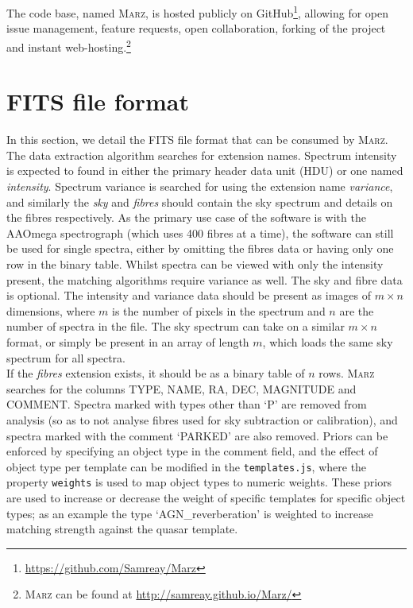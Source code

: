 \documentclass[iop]{emulateapj}
\newcommand{\marz}{\textsc{Marz}}
\begin{document}
The code base, named \marz{}, is hosted publicly on GitHub\footnote{\url{https://github.com/Samreay/Marz}}, allowing for open issue management, feature requests, open collaboration, forking of the project and instant web-hosting.\footnote{\marz{} can be found at \url{http://samreay.github.io/Marz/}}







\section{FITS file format}

In this section, we detail the FITS file format that can be consumed by \marz{}. The data extraction algorithm searches for extension names. Spectrum intensity is expected to found in either the primary header data unit (HDU) or one named \textit{intensity}. Spectrum variance is searched for using the extension name \textit{variance}, and similarly the \textit{sky} and \textit{fibres} should contain the sky spectrum and details on the fibres respectively. As the primary use case of the software is with the AAOmega spectrograph (which uses 400 fibres at a time), the software can still be used for single spectra, either by omitting the fibres data or having only one row in the binary table. Whilst spectra can be viewed with only the intensity present, the matching algorithms require variance as well. The sky and fibre data is optional. The intensity and variance data should be present as images of $m\times n$ dimensions, where $m$ is the number of pixels in the spectrum and $n$ are the number of spectra in the file. The sky spectrum can take on a similar $m\times n$ format, or simply be present in an array of length $m$, which loads the same sky spectrum for all spectra.\\

If the \textit{fibres} extension exists, it should be as a binary table of $n$ rows. \marz{} searches for the columns TYPE, NAME, RA, DEC, MAGNITUDE and COMMENT. Spectra marked with types other than `P' are removed from analysis (so as to not analyse fibres used for sky subtraction or calibration), and spectra marked with the comment `PARKED' are also removed. Priors can be enforced by specifying an object type in the comment field, and the effect of object type per template can be modified in the \verb;templates.js;, where the property \verb;weights; is used to map object types to numeric weights. These priors are used to increase or decrease the weight of specific templates for specific object types; as an example the type `AGN\_reverberation' is weighted to increase matching strength against the quasar template.\\
\end{document}
